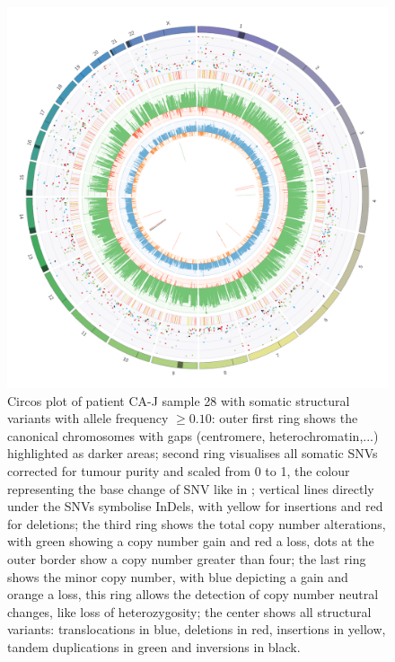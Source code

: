 \begin{figure}[ht]
\centering
\includegraphics[width=.99\linewidth]{Figures/CASCADE/CA80/CA80-28.circos.png}
\caption[Circos plot of patient CA-J sample 28]{Circos plot of patient CA-J sample 28 with somatic structural variants with allele frequency $\geq 0.10$: outer first ring shows the canonical chromosomes with gaps (centromere, heterochromatin,...) highlighted as darker areas; second ring visualises all somatic SNVs corrected for tumour purity and scaled from 0 to 1, the colour representing the base change of SNV like in \protect\textcite{Alexandrov2013}; vertical lines directly under the SNVs symbolise InDels, with yellow for insertions and red for deletions; the third ring shows the total copy number alterations, with green showing a copy number gain and red a loss, dots at the outer border show a copy number greater than four; the last ring shows the minor copy number, with blue depicting a gain and orange a loss, this ring allows the detection of copy number neutral changes, like loss of heterozygosity; the center shows all structural variants: translocations in blue, deletions in red, insertions in yellow, tandem duplications in green and inversions in black.} \label{fig:ca80.28circos}
\end{figure}

